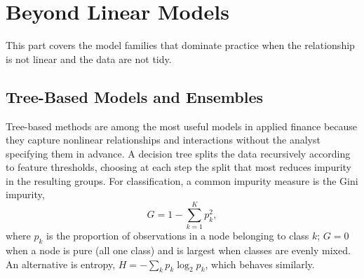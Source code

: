 \documentclass[../ai_in_finance]{subfiles}
\begin{document}
\section{Beyond Linear Models}

This part covers the model families that dominate practice when the relationship is not linear and the data are not tidy.

\subsection{Tree-Based Models and Ensembles}
\label{sec:tree-models}

Tree-based methods are among the most useful models in applied finance because they capture nonlinear relationships and interactions without the analyst specifying them in advance. A decision tree splits the data recursively according to feature thresholds, choosing at each step the split that most reduces impurity in the resulting groups. For classification, a common impurity measure is the Gini impurity,
\begin{equation*}
G = 1 - \sum_{k=1}^K p_k^2,
\end{equation*}
where $p_k$ is the proportion of observations in a node belonging to class $k$; $G=0$ when a node is pure (all one class) and is largest when classes are evenly mixed. An alternative is entropy, $H = -\sum_k p_k \log_2 p_k$, which behaves similarly.

\end{document}
